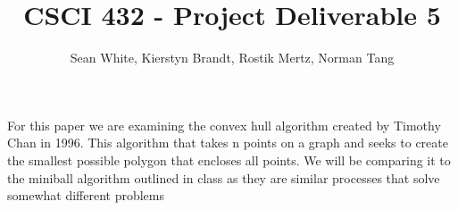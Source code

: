 \documentclass[12pt]{article}
\author{Sean White, Kierstyn Brandt, Rostik Mertz, Norman Tang}
\title{CSCI 432 - Project Deliverable 5}
\begin{document}
\maketitle

For this paper we are examining the convex hull algorithm created by Timothy Chan in 1996. This algorithm that takes n points on a graph and seeks to create the smallest possible polygon that encloses all points. We will be comparing it to the miniball algorithm outlined in class as they are similar processes that solve somewhat different problems 
\end{document}
